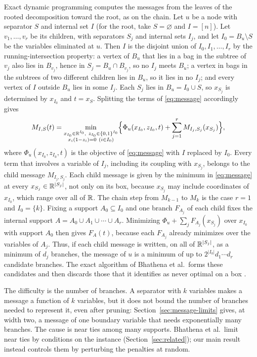 Exact dynamic programming computes the messages from the leaves of the
rooted decomposition toward the root, as on the chain. Let $u$ be a node
with separator $S$ and internal set $I$ (for the root, take
$S=\varnothing$ and $I=[n]$). Let $v_1,\ldots,v_r$ be its children, with
separators $S_j$ and internal sets $I_j$, and let $I_0=B_u\setminus S$
be the variables eliminated at $u$. Then $I$ is the disjoint union of
$I_0,I_1,\ldots,I_r$ by the running-intersection property: a vertex of
$B_u$ that lies in a bag in the subtree of $v_j$ also lies in $B_{v_j}$,
hence in $S_j=B_u\cap B_{v_j}$, so no $I_j$ meets $B_u$; a vertex in
bags in the subtrees of two different children lies in $B_u$, so it
lies in no $I_j$; and every vertex of $I$ outside $B_u$ lies in some
$I_j$. Each $S_j$ lies in $B_u=I_0\cup S$, so $x_{S_j}$ is determined by
$x_{I_0}$ and $t=x_S$. Splitting the terms of \eqref{eq:message}
accordingly gives
\[
 M_{I,S}(t)=\min_{\substack{x_{I_0}\in\mathbb R^{I_0},\
                     z_{I_0}\in\{0,1\}^{I_0}\\
                     x_i(1-z_i)=0\ (i\in I_0)}}
 \Bigl\{\Phi_u(x_{I_0},z_{I_0},t)
        +\sum_{j=1}^rM_{I_j,S_j}(x_{S_j})\Bigr\},
\]
where $\Phi_u(x_{I_0},z_{I_0},t)$ is the objective of \eqref{eq:message}
with $I$ replaced by $I_0$. Every term that involves a variable of
$I_j$, including its coupling with $x_{S_j}$, belongs to the child
message $M_{I_j,S_j}$. Each child message is given by the minimum in
\eqref{eq:message} at every $x_{S_j}\in\mathbb R^{|S_j|}$, not only on its box,
because $x_{S_j}$ may include coordinates of $x_{I_0}$, which range over
all of $\mathbb R$. The chain step from $M_{k-1}$ to $M_k$ is the case $r=1$
and $I_0=\{k\}$. Fixing a support $A_0\subseteq I_0$ and one branch
$F_{A_j}$ of each child fixes the internal support
$A=A_0\cup A_1\cup\cdots\cup A_r$. Minimizing
$\Phi_u+\sum_jF_{A_j}(x_{S_j})$ over $x_{I_0}$ with support $A_0$ then
gives $F_A(t)$, because each $F_{A_j}$ already minimizes over the
variables of $A_j$. Thus, if each child message is written, on all of
$\mathbb R^{|S_j|}$, as a minimum of $d_j$ branches, the message of $u$ is a
minimum of up to $2^{|I_0|}d_1\cdots d_r$ candidate branches. The exact
algorithm of Bhathena et al.\ forms these candidates and then discards
those that it identifies as never optimal on a box
\cite[Sections~4 and~5]{BhathenaStructured}.

The difficulty is the number of branches. A separator with $k$ variables
makes a message a function of $k$ variables, but it does not bound the
number of branches needed to represent it, even after pruning:
Section~\ref{sec:message-limits} gives, at width two, a message of one
boundary variable that needs exponentially many branches. The cause is
near ties among many supports. Bhathena et al.\ limit near ties by
conditions on the instance (Section~\ref{sec:related}); our main result
instead controls them by perturbing the penalties at random.

